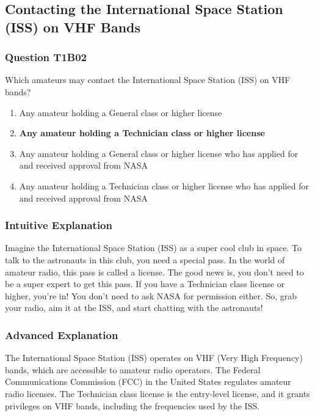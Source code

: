 \subsection{Contacting the International Space Station (ISS) on VHF Bands}
\subsubsection{Question T1B02}
\begin{tcolorbox}[colback=gray!10!white,colframe=black!75!black,title=T1B02]
Which amateurs may contact the International Space Station (ISS) on VHF bands?
\begin{enumerate}[label=\Alph*]
    \item Any amateur holding a General class or higher license
    \item \textbf{Any amateur holding a Technician class or higher license}
    \item Any amateur holding a General class or higher license who has applied for and received approval from NASA
    \item Any amateur holding a Technician class or higher license who has applied for and received approval from NASA
\end{enumerate}
\end{tcolorbox}

\subsubsection{Intuitive Explanation}
Imagine the International Space Station (ISS) as a super cool club in space. To talk to the astronauts in this club, you need a special pass. In the world of amateur radio, this pass is called a license. The good news is, you don’t need to be a super expert to get this pass. If you have a Technician class license or higher, you’re in! You don’t need to ask NASA for permission either. So, grab your radio, aim it at the ISS, and start chatting with the astronauts!

\subsubsection{Advanced Explanation}
The International Space Station (ISS) operates on VHF (Very High Frequency) bands, which are accessible to amateur radio operators. The Federal Communications Commission (FCC) in the United States regulates amateur radio licenses. The Technician class license is the entry-level license, and it grants privileges on VHF bands, including the frequencies used by the ISS.

